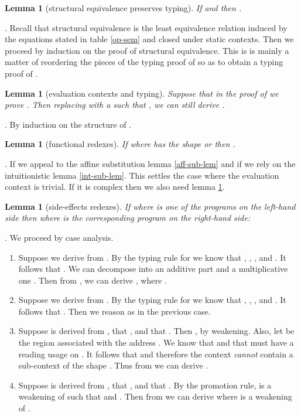 \documentclass[11pt]{article}
\newtheorem{lemma}[theorem]{Lemma}
\newcommand{\Proof}{\noindent {\sc Proof}. }
\newcommand{\qed}{\hfill}
\begin{document}
\begin{lemma}[structural equivalence preserves typing] \label{sub-red-equ}
If  and  then .
\end{lemma}
\Proof
Recall that structural equivalence is the least equivalence
relation induced by the equations stated in 
table \ref{op-sem} and closed under static contexts.
Then we proceed by induction on the proof of structural equivalence.
This is is mainly a matter of reordering the pieces of the typing
proof of  so as to obtain a typing proof of .
\qed



\begin{lemma}[evaluation contexts and typing]  \label{eva-sub-lem}
Suppose that in the proof of  
we prove . Then replacing  with a 
 such that , we can still derive
.
\end{lemma}
\Proof
By induction on the structure of .
\qed


\begin{lemma}[functional redexes]\label{fun-redex}
If  where 
 has the shape  or  then
.
\end{lemma}
\Proof
If  we appeal to the affine substitution
lemma \ref{aff-sub-lem} and if  we rely on the
intuitionistic lemma \ref{int-sub-lem}. This settles the case
where the evaluation context  is trivial. If it is complex
then we also need  lemma \ref{eva-sub-lem}.
\qed


\begin{lemma}[side-effects redexes]\label{side-eff-redex}
If  where
 is one of the programs on the left-hand
side then  where
 is the corresponding program on the right-hand side:

\end{lemma}
\Proof
We proceed by case analysis.

\begin{enumerate}


\item Suppose we derive  from
.
By the typing rule for  we know that 
, ,
, and
.
It follows that .
We can decompose  into an additive part 
 and a multiplicative one 
.
Then from ,
we can derive , where
.


\item Suppose we derive  from
.
By the typing rule for  we know that 
, ,
, and
.
It follows that .
Then we reason as in the previous case.


\item Suppose  is derived from
, that ,
and that .
Then , by weakening.
Also, let  be the region associated with the address . We know
that  and that  must have a reading usage on .
It follows that  and therefore the context
 {\em cannot} contain a sub-context of the shape . 
Thus from    we
can derive .

\item  Suppose  is derived from
, 
that ,
and that .
By the promotion rule,  is a weakening of 
 such that  and 
. 
Then from  we can derive
 where  is a
weakening of 
.\qed

\end{enumerate}
\end{document}
